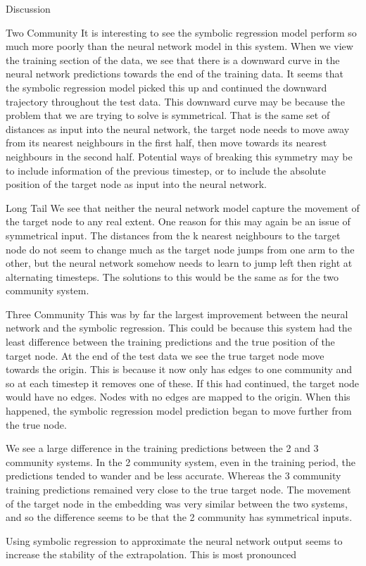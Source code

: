 \documentclass{article}
\begin{document}
\begin{section}{Discussion}
    \begin{subsection}{Two Community}
        It is interesting to see the symbolic regression model perform so much more poorly than the neural network model in this system. When we view the training section of the data, we see that there is a downward curve in the neural network predictions towards the end of the training data. It seems that the symbolic regression model picked this up and continued the downward trajectory throughout the test data. This downward curve may be because the problem that we are trying to solve is symmetrical. That is the same set of distances as input into the neural network, the target node needs to move away from its nearest neighbours in the first half, then move towards its nearest neighbours in the second half. Potential ways of breaking this symmetry may be to include information of the previous timestep, or to include the absolute position of the target node as input into the neural network. 

    \end{subsection}

    \begin{subsection}{Long Tail}
        We see that neither the neural network model capture the movement of the target node to any real extent. One reason for this may again be an issue of symmetrical input. The distances from the k nearest neighbours to the target node do not seem to change much as the target node jumps from one arm to the other, but the neural network somehow needs to learn to jump left then right at alternating timesteps. The solutions to this would be the same as for the two community system.
    \end{subsection}
    \begin{subsection}{Three Community}
        This was by far the largest improvement between the neural network and the symbolic regression. This could be because this system had the least difference between the training predictions and the true position of the target node. At the end of the test data we see the true target node move towards the origin. This is because it now only has edges to one community and so at each timestep it removes one of these. If this had continued, the target node would have no edges. Nodes with no edges are mapped to the origin. When this happened, the symbolic regression model prediction began to move further from the true node.

        We see a large difference in the training predictions between the 2 and 3 community systems. In the 2 community system, even in the training period, the predictions tended to wander and be less accurate. Whereas the 3 community training predictions remained very close to the true target node. The movement of the target node in the embedding was very similar between the two systems, and so the difference seems to be that the 2 community has symmetrical inputs.
    \end{subsection}
    Using symbolic regression to approximate the neural network output seems to increase the stability of the extrapolation. This is most pronounced 


\end{section}
\end{document}
